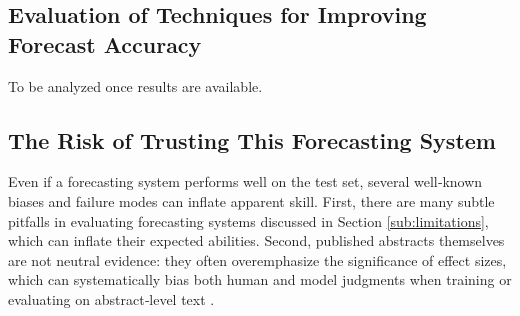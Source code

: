 \documentclass[12pt,a4paper]{article}
\begin{document}
\subsection{Evaluation of Techniques for Improving Forecast Accuracy} \label{sub:strengths_and_weaknesses_of_this_forecasting_system}
To be analyzed once results are available. %

\subsection{The Risk of Trusting This Forecasting System}
\label{subsec:risk_trusting_system}

Even if a forecasting system performs well on the test set, several well‐known biases and failure modes can inflate apparent skill. First, there are many subtle pitfalls in evaluating forecasting systems discussed in Section \ref{sub:limitations}, which can inflate their expected abilities. Second, published abstracts themselves are not neutral evidence: they often overemphasize the significance of effect sizes, which can systematically bias both human and model judgments when training or evaluating on abstract‐level text . 
\end{document}
